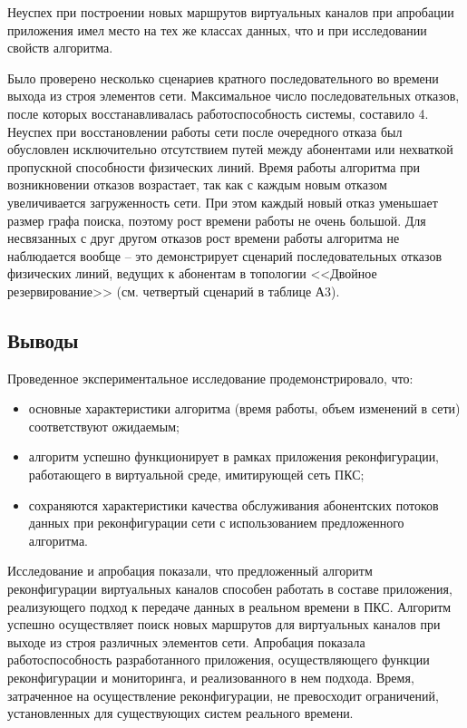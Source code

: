 \documentclass[12pt, a4paper]{article}
\begin{document}
Неуспех при построении новых маршрутов виртуальных каналов при апробации приложения имел место на тех же классах данных, что и при исследовании свойств алгоритма.

Было проверено несколько сценариев кратного последовательного во времени выхода из строя элементов сети. Максимальное число последовательных отказов, после которых восстанавливалась работоспособность системы, составило 4. Неуспех при восстановлении работы сети после очередного отказа был обусловлен исключительно отсутствием путей между абонентами или нехваткой пропускной способности физических линий. Время работы алгоритма при возникновении отказов возрастает, так как с каждым новым отказом увеличивается загруженность сети. При этом каждый новый отказ уменьшает размер графа поиска, поэтому рост времени работы не очень большой. Для несвязанных с друг другом отказов рост времени работы алгоритма не наблюдается вообще -- это демонстрирует сценарий последовательных отказов физических линий, ведущих к абонентам в топологии <<Двойное резервирование>> (см. четвертый сценарий в таблице А3).

\subsection{Выводы}
Проведенное экспериментальное исследование продемонстрировало, что:
\begin{itemize}
	\item основные характеристики алгоритма (время работы, объем изменений в сети) соответствуют ожидаемым;
	\item алгоритм успешно функционирует в рамках приложения реконфигурации, работающего в виртуальной среде, имитирующей сеть ПКС;
	\item сохраняются характеристики качества обслуживания абонентских потоков данных при реконфигурации сети с использованием предложенного алгоритма.
\end{itemize}

Исследование и апробация показали, что предложенный алгоритм реконфигурации виртуальных каналов способен работать в составе приложения, реализующего подход к передаче данных в реальном времени в ПКС. Алгоритм успешно осуществляет поиск новых маршрутов для виртуальных каналов при выходе из строя различных элементов сети. Апробация показала работоспособность разработанного приложения, осуществляющего функции реконфигурации и мониторинга, и реализованного в нем подхода. Время, затраченное на осуществление реконфигурации, не превосходит ограничений, установленных для существующих систем реального времени.
\end{document}
